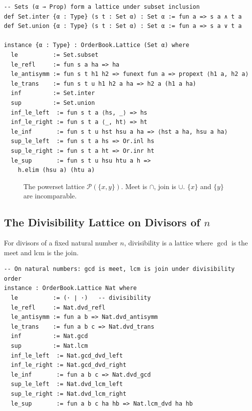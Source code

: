 \documentclass[12pt, a4paper, openright]{book}
\theoremstyle{thmstyle}
\theoremstyle{defstyle}
\begin{document}
\begin{verbatim}
-- Sets (α → Prop) form a lattice under subset inclusion
def Set.inter {α : Type} (s t : Set α) : Set α := fun a => s a ∧ t a
def Set.union {α : Type} (s t : Set α) : Set α := fun a => s a ∨ t a

instance {α : Type} : OrderBook.Lattice (Set α) where
  le          := Set.subset
  le_refl     := fun s a ha => ha
  le_antisymm := fun s t h1 h2 => funext fun a => propext ⟨h1 a, h2 a⟩
  le_trans    := fun s t u h1 h2 a ha => h2 a (h1 a ha)
  inf         := Set.inter
  sup         := Set.union
  inf_le_left  := fun s t a ⟨hs, _⟩ => hs
  inf_le_right := fun s t a ⟨_, ht⟩ => ht
  le_inf       := fun s t u hst hsu a ha => ⟨hst a ha, hsu a ha⟩
  sup_le_left  := fun s t a hs => Or.inl hs
  sup_le_right := fun s t a ht => Or.inr ht
  le_sup       := fun s t u hsu htu a h =>
    h.elim (hsu a) (htu a)
\end{verbatim}

\begin{figure}[H]
  \centering
  \caption{The powerset lattice $\mathcal{P}(\{x,y\})$.
           Meet is $\cap$, join is $\cup$.
           $\{x\}$ and $\{y\}$ are incomparable.}
\end{figure}

\subsection{The Divisibility Lattice on Divisors of $n$}

For divisors of a fixed natural number $n$, divisibility is a lattice where
$\gcd$ is the meet and $\mathrm{lcm}$ is the join.

\begin{verbatim}
-- On natural numbers: gcd is meet, lcm is join under divisibility order
instance : OrderBook.Lattice Nat where
  le          := (· ∣ ·)   -- divisibility
  le_refl     := Nat.dvd_refl
  le_antisymm := fun a b => Nat.dvd_antisymm
  le_trans    := fun a b c => Nat.dvd_trans
  inf         := Nat.gcd
  sup         := Nat.lcm
  inf_le_left  := Nat.gcd_dvd_left
  inf_le_right := Nat.gcd_dvd_right
  le_inf       := fun a b c => Nat.dvd_gcd
  sup_le_left  := Nat.dvd_lcm_left
  sup_le_right := Nat.dvd_lcm_right
  le_sup       := fun a b c ha hb => Nat.lcm_dvd ha hb
\end{verbatim}
\end{document}
